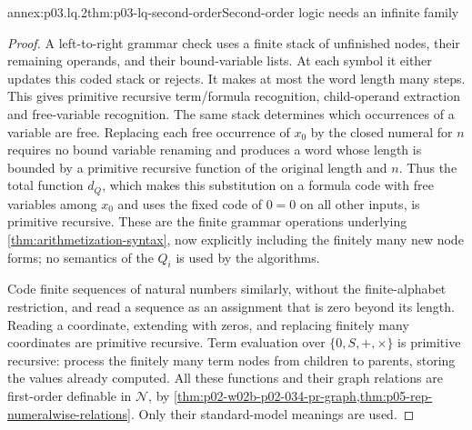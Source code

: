 \begin{annexitem}{annex:p03.lq.2}{thm:p03-lq-second-order}{Second-order logic needs an infinite family}
\begin{proof}
A left-to-right grammar check uses a finite stack of unfinished
nodes, their remaining operands, and their bound-variable lists.
At each symbol it either updates this coded stack or rejects.
It makes at most the word length many steps. This gives primitive
recursive term/formula recognition, child-operand extraction and
free-variable recognition. The same stack determines which
occurrences of a variable are free. Replacing each free occurrence
of \(x_0\) by the closed numeral for \(n\) requires no bound
variable renaming and produces a word whose length is bounded
by a primitive recursive function of the original length and \(n\).
Thus the total function \(d_Q\), which makes this substitution
on a formula code with free variables among \(x_0\) and uses the
fixed code of \(0=0\) on all other inputs, is primitive recursive.
These are the finite grammar operations underlying
\cref{thm:arithmetization-syntax}, now explicitly including the
finitely many new node forms; no semantics of the \(Q_i\) is
used by the algorithms.

Code finite sequences of natural numbers similarly, without the
finite-alphabet restriction, and read a sequence as an assignment
that is zero beyond its length. Reading a coordinate, extending
with zeros, and replacing finitely many coordinates are primitive
recursive. Term evaluation over \(\{0,S,+,\times\}\) is
primitive recursive: process the finitely many term nodes from
children to parents, storing the values already computed.
All these functions and their graph relations are first-order
definable in \(\mathcal N\), by
\cref{thm:p02-w02b-p02-034-pr-graph,thm:p05-rep-numeralwise-relations}.
Only their standard-model meanings are used.


\end{proof}
\end{annexitem}
